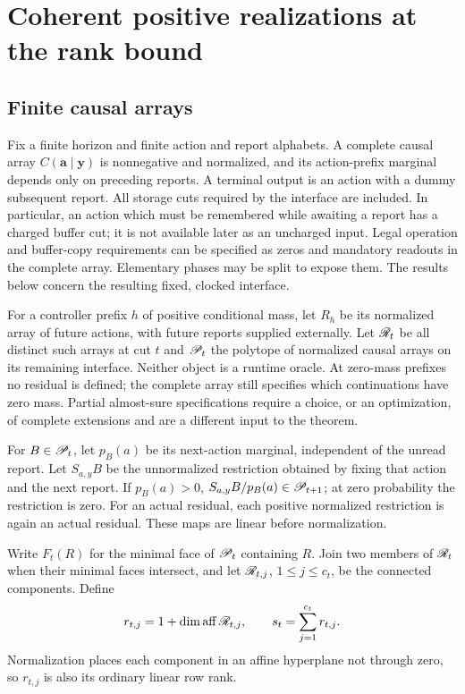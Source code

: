 \section{Coherent positive realizations at the rank bound}
\label{sec:coherence}
\subsection{Finite causal arrays}
Fix a finite horizon and finite action and report alphabets. A complete
causal array $C(\mathbf a\mid\mathbf y)$ is nonnegative and normalized,
and its action-prefix marginal depends only on preceding reports. A
terminal output is an action with a dummy subsequent report. All storage
cuts required by the interface are included. In particular, an action
which must be remembered while awaiting a report has a charged buffer
cut; it is not available later as an uncharged input. Legal operation and
buffer-copy requirements can be specified as zeros and mandatory readouts
in the complete array. Elementary phases may be split to expose them.
The results below concern the resulting fixed, clocked interface.

For a controller prefix $h$ of positive conditional mass, let $R_h$ be
its normalized array of future actions, with future reports supplied
externally. Let $\mathscr R_t$ be all distinct such arrays at cut $t$ and
$\mathscr P_t$ the polytope of normalized causal arrays on its remaining
interface. Neither object is a runtime oracle. At zero-mass prefixes
no residual is defined; the complete array still specifies which
continuations have zero mass. Partial almost-sure specifications require
a choice, or an optimization, of complete extensions and are a different
input to the theorem.

For $B\in\mathscr P_t$, let $p_B(a)$ be its next-action marginal, independent
of the unread report. Let $S_{a,y}B$ be the unnormalized restriction
obtained by fixing that action and the next report. If $p_B(a)>0$,
$S_{a,y}B/p_B(a)\in\mathscr P_{t+1}$; at zero probability the restriction is
zero. For an actual residual, each positive normalized restriction is
again an actual residual. These maps are linear before normalization.

Write $F_t(R)$ for the minimal face of $\mathscr P_t$ containing $R$.
Join two members of $\mathscr R_t$ when their minimal faces intersect, and let
$\mathscr R_{t,j}$, $1\le j\le c_t$, be the connected components. Define
\begin{equation}\label{eq:support-rank}
 r_{t,j}=1+\dim\operatorname{aff}\mathscr R_{t,j},\qquad s_t=\sum_{j=1}^{c_t}r_{t,j}.
\end{equation}
Normalization places each component in an affine hyperplane not through
zero, so $r_{t,j}$ is also its ordinary linear row rank.

